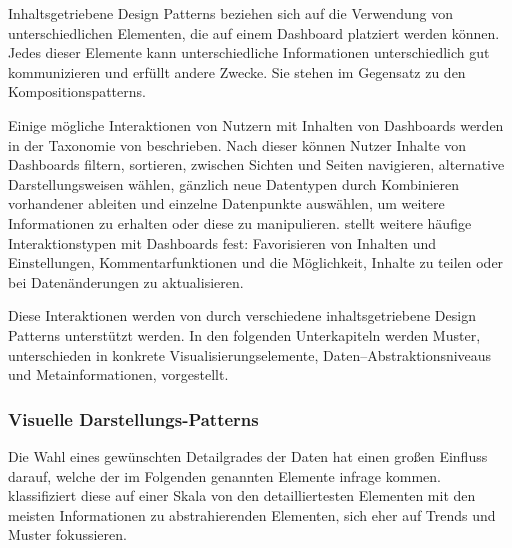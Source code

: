 Inhaltsgetriebene Design Patterns beziehen sich auf die Verwendung von unterschiedlichen Elementen, die auf einem Dashboard platziert werden können.
Jedes dieser Elemente kann unterschiedliche Informationen unterschiedlich gut kommunizieren und erfüllt andere Zwecke.
Sie stehen im Gegensatz zu den Kompositionspatterns.

Einige mögliche Interaktionen von Nutzern mit Inhalten von Dashboards werden in der Taxonomie von \autocite[S. 46]{Heer.InteractiveDynamicsVisualAnalysis.2012} beschrieben.
Nach dieser können Nutzer Inhalte von Dashboards filtern, sortieren, zwischen Sichten und Seiten navigieren, alternative Darstellungsweisen wählen, gänzlich neue Datentypen durch Kombinieren vorhandener ableiten und einzelne Datenpunkte auswählen, um weitere Informationen zu erhalten oder diese zu manipulieren.
\autocite[S. 25]{MarcusHomannVassilenaBanovaPaulOelbermannHolgerWittgesandHelmutKrcmar.TowardsUserInterfaceComponentsforDashboardApplicationsonSmartphones.2013} stellt weitere häufige Interaktionstypen mit Dashboards fest:
Favorisieren von Inhalten und Einstellungen, Kommentarfunktionen und die Möglichkeit, Inhalte zu teilen oder bei Datenänderungen zu aktualisieren.

Diese Interaktionen werden von durch verschiedene inhaltsgetriebene Design Patterns unterstützt werden.
In den folgenden Unterkapiteln werden Muster, unterschieden in konkrete Visualisierungselemente, Daten--Abstraktionsniveaus und Metainformationen, vorgestellt.

\subsubsection{Visuelle Darstellungs-Patterns}

Die Wahl eines gewünschten Detailgrades der Daten hat einen großen Einfluss darauf, welche der im Folgenden genannten Elemente infrage kommen.
\autocite[S. 3]{Bach.DashboardDesignPatterns.2023} klassifiziert diese auf einer Skala von den detailliertesten Elementen mit den meisten Informationen zu abstrahierenden Elementen, sich eher auf Trends und Muster fokussieren.


